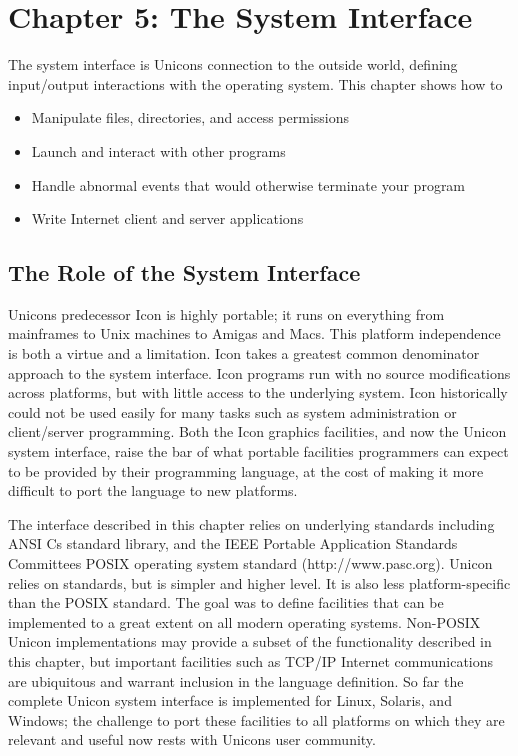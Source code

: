 \clearpage\section{Chapter 5: The System Interface}

The system interface is
Unicon{\textquotesingle}s connection to the outside world, defining
input/output interactions with the
operating system. This chapter shows how to

\begin{itemize}\itemsep0pt
\item Manipulate files, directories, and
access permissions
\item Launch and interact with other programs
\item Handle abnormal events that would otherwise terminate your program
\item Write Internet client and
server applications
\end{itemize}

\subsection{The Role of the System Interface}

Unicon{\textquotesingle}s predecessor Icon is highly portable; it runs
on everything from mainframes to Unix machines to Amigas and Macs. This
platform independence is both a virtue and a limitation. Icon takes a
greatest common denominator approach to the system interface. Icon
programs run with no source modifications across platforms, but with
little access to the underlying system. Icon historically could not be
used easily for many tasks such as system administration or
client/server programming. Both the Icon graphics facilities, and now
the Unicon system interface, {\textquotedbl}raise the
bar{\textquotedbl} of what portable facilities programmers can expect
to be provided by their programming language, at the cost of making it
more difficult to port the language to new platforms.

The interface described in this chapter relies on underlying
standards including ANSI C{\textquotesingle}s standard 
library, and the IEEE Portable Application Standards
Committee{\textquotesingle}s POSIX operating system
standard (http://www.pasc.org). Unicon relies on standards, but
is simpler and higher level. It is also less platform-specific than the
POSIX standard. The goal was to define facilities that can be
implemented to a great extent on all modern operating systems.
Non-POSIX Unicon implementations may provide a subset of the
functionality described in this chapter, but important facilities such
as TCP/IP Internet communications are ubiquitous
and warrant inclusion in the language definition. So far the complete
Unicon system interface is implemented for Linux, Solaris,
and Windows; the challenge to port these facilities to all platforms on
which they are relevant and useful now rests with
Unicon{\textquotesingle}s user community.

